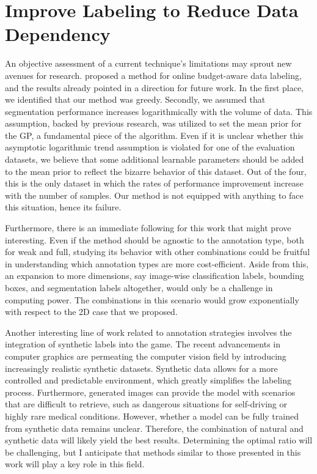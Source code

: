 
\section{Improve Labeling to Reduce Data Dependency}
An objective assessment of a current technique's limitations may sprout new avenues for research.  proposed a method for online budget-aware data labeling, and the results already pointed in a direction for future work. In the first place, we identified that our method was greedy. Secondly, we assumed that segmentation performance increases logarithmically with the volume of data. This assumption, backed by previous research, was utilized to set the mean prior for the GP, a fundamental piece of the algorithm. Even if it is unclear whether this asymptotic logarithmic trend assumption is violated for one of the evaluation datasets, we believe that some additional learnable parameters should be added to the mean prior to reflect the bizarre behavior of this dataset. Out of the four, this is the only dataset in which the rates of performance improvement increase with the number of samples. Our method is not equipped with anything to face this situation, hence its failure.

Furthermore, there is an immediate following for this work that might prove interesting. Even if the method should be agnostic to the annotation type, both for weak and full, studying its behavior with other combinations could be fruitful in understanding which annotation types are more cost-efficient. Aside from this, an expansion to more dimensions, say image-wise classification labels, bounding boxes, and segmentation labels altogether, would only be a challenge in computing power. The combinations in this scenario would grow exponentially with respect to the 2D case that we proposed.

Another interesting line of work related to annotation strategies involves the integration of synthetic labels into the game. The recent advancements in computer graphics are permeating the computer vision field by introducing increasingly realistic synthetic datasets. Synthetic data allows for a more controlled and predictable environment, which greatly simplifies the labeling process. Furthermore, generated images can provide the model with scenarios that are difficult to retrieve, such as dangerous situations for self-driving or highly rare medical conditions. However, whether a model can be fully trained from synthetic data remains unclear. Therefore, the combination of natural and synthetic data will likely yield the best results. Determining the optimal ratio will be challenging, but I anticipate that methods similar to those presented in this work will play a key role in this field. 

